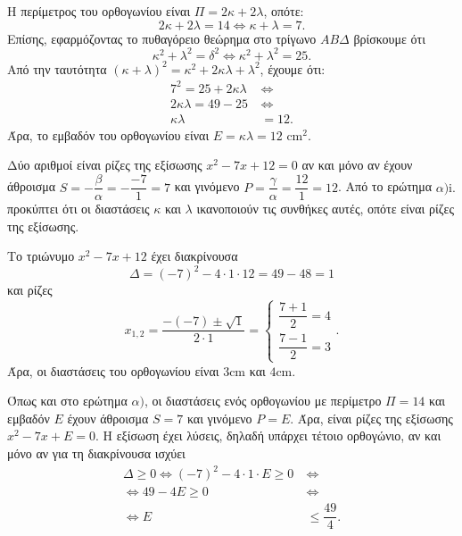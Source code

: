 
\begin{alist}
\item 
\begin{rlist}
\item Η περίμετρος του ορθογωνίου είναι $\Pi = 2\kappa + 2\lambda$, οπότε:
\[2\kappa + 2\lambda = 14 \Leftrightarrow \kappa + \lambda = 7.\]
Επίσης, εφαρμόζοντας το πυθαγόρειο θεώρημα στο τρίγωνο $A B \Delta$ βρίσκουμε ότι
\[\kappa^2 + \lambda^2 = \delta^2 \Leftrightarrow \kappa^2 + \lambda^2 = 25.\]
Από την ταυτότητα $(\kappa + \lambda)^2 = \kappa^2 + 2\kappa\lambda + \lambda^2$, έχουμε ότι:
\begin{align*}
7^2 = 25 + 2\kappa\lambda \ &\Leftrightarrow \\
2\kappa\lambda = 49 - 25 \ &\Leftrightarrow \\
\kappa\lambda &= 12.
\end{align*}
Άρα, το εμβαδόν του ορθογωνίου είναι $E = \kappa\lambda = 12 \text{ cm}^2$.

\item Δύο αριθμοί είναι ρίζες της εξίσωσης $x^2 - 7x + 12 = 0$ αν και μόνο αν έχουν
άθροισμα $S = -\dfrac{\beta}{\alpha} = -\dfrac{-7}{1} = 7$ και γινόμενο $P = \dfrac{\gamma}{\alpha} = \dfrac{12}{1} = 12$. Από το ερώτημα $\alpha\text{)i.}$
προκύπτει ότι οι διαστάσεις $\kappa$ και $\lambda$ ικανοποιούν τις συνθήκες αυτές, οπότε είναι ρίζες
της εξίσωσης.

\item Το τριώνυμο $x^2 - 7x + 12$ έχει διακρίνουσα
\[\Delta = (-7)^2 - 4 \cdot 1 \cdot 12 = 49 - 48 = 1\]
και ρίζες
\[x_{1,2} = \dfrac{-(-7) \pm \sqrt{1}}{2 \cdot 1} = \begin{cases} \dfrac{7 + 1}{2} = 4 \\ \dfrac{7 - 1}{2} = 3 \end{cases}.\]
Άρα, οι διαστάσεις του ορθογωνίου είναι $3\text{cm}$ και $4\text{cm}$.
\end{rlist}

\item Όπως και στο ερώτημα $\alpha)$, οι διαστάσεις ενός ορθογωνίου με περίμετρο $\Pi = 14$ και
εμβαδόν $E$ έχουν άθροισμα $S = 7$ και γινόμενο $P = E$. Άρα, είναι ρίζες της εξίσωσης
$x^2 - 7x + E = 0$.
Η εξίσωση έχει λύσεις, δηλαδή υπάρχει τέτοιο ορθογώνιο, αν και μόνο αν για τη διακρίνουσα
ισχύει
\begin{align*}
\Delta \ge 0 \Leftrightarrow (-7)^2 - 4 \cdot 1 \cdot E \ge 0 \ &\Leftrightarrow \\
\Leftrightarrow 49 - 4E \ge 0 \ &\Leftrightarrow \\
\Leftrightarrow E &\le \dfrac{49}{4}.
\end{align*}
\end{alist}

